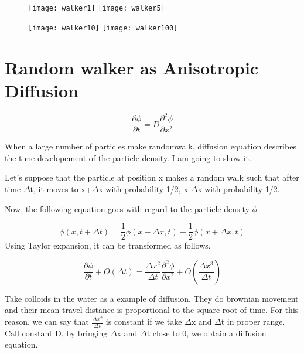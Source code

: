 \documentclass[12pt,a4paper]{scrartcl}
\begin{document}
\begin{figure}
  \centering
  \texttt{[image: walker1]}
  \texttt{[image: walker5]}
\end{figure}

\begin{figure}
  \texttt{[image: walker10]}
  \texttt{[image: walker100]}
\end{figure}

\clearpage


\section{Random walker as Anisotropic Diffusion}
\[
\frac{\partial \phi}{\partial t} = D \frac{\partial^{2} \phi}{\partial x^{2}}
\]

When a large number of particles make randomwalk, diffusion equation describes the time developement of the particle density. I am going to show it.

Let's suppose that the particle at position x makes a random walk such that after time \(\Delta\)t, it moves to x+\(\Delta\)x with probability 1/2, x-\(\Delta\)x with probability 1/2.

Now, the following equation goes with regard to the particle density \(\phi\)

\[
\phi (x,t+\Delta t) = \frac{1}{2}\phi (x-\Delta x,t) + \frac{1}{2}\phi (x+\Delta x,t)
\]
Using Taylor expansion, it can be transformed as follows.

\[
\frac{\partial \phi}{\partial t} + O(\Delta t) = \frac{\Delta x^{2}}{\Delta t} \frac{\partial^{2} \phi}{\partial x^{2}} + O(\frac{\Delta x^{3}}{\Delta t})
\]

Take colloids in the water as a example of diffusion. They do brownian movement and their mean travel distance is proportional to the square root of time. For this reason, we can say that \(\frac{\Delta x^{2}}{\Delta t}\) is constant if we take \(\Delta\)x and \(\Delta\)t in proper range. Call constant D, by bringing \(\Delta\)x and \(\Delta\)t close to 0, we obtain a diffusion equation.
\end{document}
